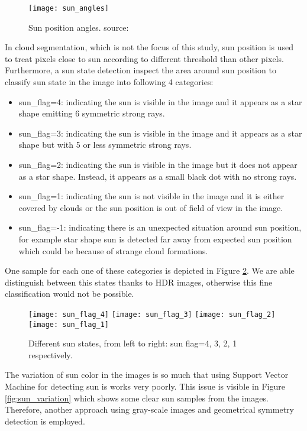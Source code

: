\begin{figure}[h]
\caption{Sun position angles.  source:\cite{sun_angle_pic}}
\label{fig:sun_position_angles}
\texttt{[image: sun\_angles]}
\centering
\end{figure}

In cloud segmentation, which is not the focus of this study, sun position is used to treat pixels close to sun according to different threshold than other pixels. Furthermore, a sun state detection inspect the area around sun position to classify sun state in the image into following 4 categories:
\begin{itemize}
\item sun\_flag=4: indicating the sun is visible in the image and it appears as a star shape emitting 6 symmetric strong rays.
\item sun\_flag=3: indicating the sun is visible in the image and it appears as a star shape but with 5 or less symmetric strong rays.
\item  sun\_flag=2: indicating the sun is visible in the image but it does not appear as a star shape. Instead, it appears as a small black dot with no strong rays.
\item sun\_flag=1: indicating the sun is not visible in the image and it is either covered by clouds or the sun position is out of field of view in the image.
\item  sun\_flag=-1: indicating there is an unexpected situation around sun position, for example star shape sun is detected far away from expected sun position which could be because of strange cloud formations.
\end{itemize}
One sample for each one of these categories is depicted in Figure \ref{fig:sun_states}. We are able distinguish between this states thanks to HDR images, otherwise this fine classification would not be possible.

\begin{figure}[h]
\caption{Different sun states, from left to right: sun flag=4, 3, 2, 1 respectively.}
\label{fig:sun_states}
\texttt{[image: sun\_flag\_4]}
\texttt{[image: sun\_flag\_3]}
\texttt{[image: sun\_flag\_2]}
\texttt{[image: sun\_flag\_1]}
\centering
\end{figure}

The variation of sun color in the images is so much that using Support Vector Machine for detecting sun is works very poorly. This issue is visible in Figure \ref{fig:sun_variation} which shows some clear sun samples from the images. Therefore, another approach using gray-scale images and geometrical symmetry detection is employed.

